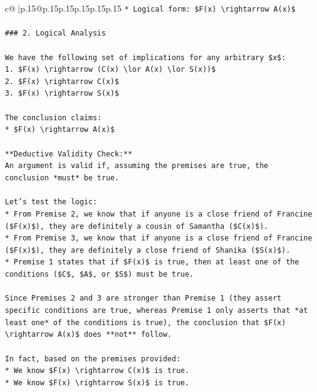 \documentclass{article}
\begin{document}
{\begin{supertabular}{c@{$\;$}|p{.15\linewidth}@{}p{.15\linewidth}p{.15\linewidth}p{.15\linewidth}p{.15\linewidth}p{.15\linewidth}}
{{{\texttt{*   Logical form: \$F(x) \textbackslash{}rightarrow A(x)\$} \\
\\ 
\texttt{\#\#\# 2. Logical Analysis} \\
\\ 
\texttt{We have the following set of implications for any arbitrary \$x\$:} \\
\texttt{1.  \$F(x) \textbackslash{}rightarrow (C(x) \textbackslash{}lor A(x) \textbackslash{}lor S(x))\$} \\
\texttt{2.  \$F(x) \textbackslash{}rightarrow C(x)\$} \\
\texttt{3.  \$F(x) \textbackslash{}rightarrow S(x)\$} \\
\\ 
\texttt{The conclusion claims:} \\
\texttt{*   \$F(x) \textbackslash{}rightarrow A(x)\$} \\
\\ 
\texttt{**Deductive Validity Check:**} \\
\texttt{An argument is valid if, assuming the premises are true, the conclusion *must* be true.} \\
\\ 
\texttt{Let's test the logic:} \\
\texttt{*   From Premise 2, we know that if anyone is a close friend of Francine (\$F(x)\$), they are definitely a cousin of Samantha (\$C(x)\$).} \\
\texttt{*   From Premise 3, we know that if anyone is a close friend of Francine (\$F(x)\$), they are definitely a close friend of Shanika (\$S(x)\$).} \\
\texttt{*   Premise 1 states that if \$F(x)\$ is true, then at least one of the conditions (\$C\$, \$A\$, or \$S\$) must be true.} \\
\\ 
\texttt{Since Premises 2 and 3 are stronger than Premise 1 (they assert specific conditions are true, whereas Premise 1 only asserts that *at least one* of the conditions is true), the conclusion that \$F(x) \textbackslash{}rightarrow A(x)\$ does **not** follow.} \\
\\ 
\texttt{In fact, based on the premises provided:} \\
\texttt{*   We know \$F(x) \textbackslash{}rightarrow C(x)\$ is true.} \\
\texttt{*   We know \$F(x) \textbackslash{}rightarrow S(x)\$ is true.} \\
}}}
\end{supertabular}}
\end{document}
